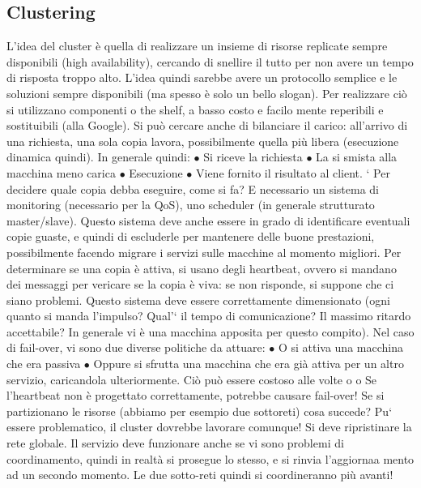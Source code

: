 \subsection{Clustering}
L'idea del cluster è quella di realizzare un insieme di risorse replicate sempre
disponibili (high availability), cercando di snellire il tutto per non avere un tempo di risposta troppo alto. L'idea
quindi sarebbe avere un protocollo semplice
e le soluzioni sempre disponibili (ma spesso è solo un bello slogan).
Per realizzare ciò si utilizzano componenti o the shelf, a basso costo e facilo
mente reperibili e sostituibili (alla Google). Si può cercare anche di bilanciare
il carico: all'arrivo di una richiesta, una sola copia lavora, possibilmente quella
più libera (esecuzione dinamica quindi). In generale quindi:
$\bullet$ Si riceve la richiesta
$\bullet$ La si smista alla macchina meno carica
$\bullet$ Esecuzione
$\bullet$ Viene fornito il risultato al client.
`
Per decidere quale copia debba eseguire, come si fa? E necessario un sistema
di monitoring (necessario per la QoS), uno scheduler (in generale strutturato
master/slave). Questo sistema deve anche essere in grado di identificare eventuali copie guaste, e quindi di escluderle
per mantenere delle buone prestazioni,
possibilmente facendo migrare i servizi sulle macchine al momento migliori. Per
determinare se una copia è attiva, si usano degli heartbeat, ovvero si mandano
dei messaggi per vericare se la copia è viva: se non risponde, si suppone che
ci siano problemi. Questo sistema deve essere correttamente dimensionato (ogni quanto si manda l'impulso? Qual'` il
tempo di comunicazione? Il massimo
ritardo accettabile? In generale vi è una macchina apposita per questo compito).
Nel caso di fail-over, vi sono due diverse politiche da attuare:
$\bullet$ O si attiva una macchina che era passiva
$\bullet$ Oppure si sfrutta una macchina che era già attiva per un altro servizio,
caricandola ulteriormente. Ciò può essere costoso alle volte
o o
Se l'heartbeat non è progettato correttamente, potrebbe causare fail-over!
Se si partizionano le risorse (abbiamo per esempio due sottoreti) cosa succede? Pu` essere problematico, il cluster
dovrebbe lavorare comunque! Si deve
ripristinare la rete globale. Il servizio deve funzionare anche se vi sono problemi
di coordinamento, quindi in realtà si prosegue lo stesso, e si rinvia l'aggiornaa
mento ad un secondo momento. Le due sotto-reti quindi si coordineranno più
avanti!
